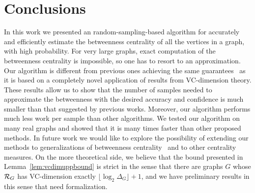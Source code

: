 \section{Conclusions}\label{sec:concl}
In this work we presented an random-sampling-based algorithm for accurately and
efficiently estimate the betweenness centrality of all the vertices in a graph,
with high probability. For very large graphs, exact computation of the
betweenness centrality is impossible, so one has to resort to an approximation.
Our algorithm is different from previous ones achieving the same
guarantees~\citep{BrandesP07,GeisbergerSS08,JacobKLPT05} as it is based on a
completely novel application of results from VC-dimension theory. These results
allow us to show that the number of samples needed to approximate the
betweenness with the desired accuracy and confidence is much smaller than that
suggested by previous works. Moreover, our algorithm performs much less work
per sample than other algorithms. We tested our algorithm on many real graphs
and showed that it is many times faster than other proposed methods. In future
work we would like to explore the possibility of extending our methods to
generalizations of betweenness centrality~\citep{DolevEP10} and to other centrality
measures. On the more theoretical side, we believe that the bound presented in
Lemma~\ref{lem:vcdimuppbound} is strict in the sense that there are graphs $G$
whose $\mathcal{R}_G$ has VC-dimension exactly $\lfloor\log_2\Delta_G\rfloor+1$, and
we have preliminary results in this sense that need formalization. 

